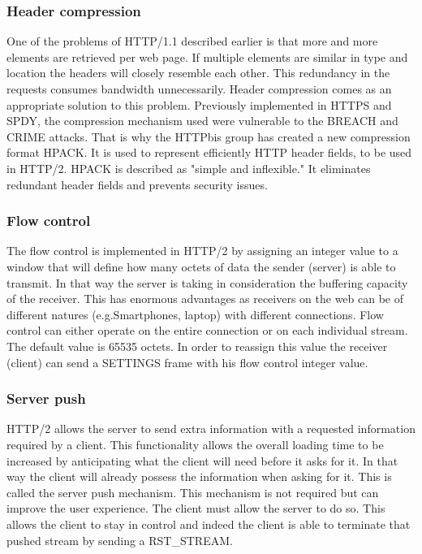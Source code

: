 \subsubsection{Header compression}
One of the problems of HTTP/1.1 described earlier is that more and more elements are retrieved per web page. If multiple elements are similar in type and location the headers will closely resemble each other. This redundancy in the requests consumes bandwidth unnecessarily.\cite{hpack} Header compression comes as an appropriate  solution to this problem. Previously implemented in HTTPS and SPDY, the compression mechanism used were vulnerable to the BREACH\cite{breach} and CRIME\cite{crime} attacks. That is why the HTTPbis group has created a new compression format HPACK\cite{hpack}. It is used to represent efficiently HTTP header fields, to be used in HTTP/2. HPACK is described as "simple and inflexible."\cite{hpack} It eliminates redundant header fields and prevents security issues.

\subsubsection{Flow control}
The flow control is implemented in HTTP/2 by assigning an integer value to a window that will define how many octets of data the sender (server) is able to transmit. In that way the server is taking in consideration the buffering capacity of the receiver. This has enormous advantages as receivers on the web can be of different natures (e.g.Smartphones, laptop) with different connections. Flow control can either operate on the entire connection or on each individual stream. The default value is 65535 octets. In order to reassign this value the receiver (client) can send a SETTINGS frame with his flow control integer value.

\subsubsection{Server push}
HTTP/2 allows the server to send extra information with a requested information required by a client. This functionality allows the overall loading time to be increased by anticipating what the client will need before it asks for it. In that way the client will already possess the information when asking for it. This is called the server push mechanism. This mechanism is not required but can improve the user experience. The client must allow the server to do so. This allows the client to stay in control and indeed the client is able to terminate that pushed stream by sending a RST\_STREAM.


